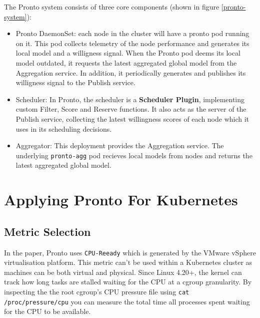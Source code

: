 The Pronto system consists of three core components (shown in figure
\ref{pronto-system}):
\begin{itemize}
    \item Pronto DaemonSet: each node in the cluster will have a pronto pod
        running on it. This pod collects telemetry of the node performance and
        generates its local model and a willigness signal. When the Pronto pod
        deems its local model outdated, it requests the latest aggregated global
        model from the Aggregation service. In addition, it periodically
        generates and publishes its willigness signal to the Publish service.
    \item Scheduler: In Pronto, the scheduler is a \textbf{Scheduler Plugin}, implementing custom
        Filter, Score and Reserve functions. It also acts as the server of the
        Publish service, collecting the latest willingness scores of each node
        which it uses in its scheduling decisions.
    \item Aggregator: This deployment provides the Aggregation service. The
        underlying \verb|pronto-agg| pod recieves local models from nodes and
        returns the latest aggregated global model.
\end{itemize}

\section{Applying Pronto For Kubernetes}

\subsection{Metric Selection}
In the paper, Pronto uses \verb|CPU-Reeady| which is generated by the VMware
vSphere virtualisation platform. This metric can't be used within a
Kubernetes cluster as machines can be both virtual and physical. Since Linux
4.20+, the kernel can track how long tasks are stalled waiting for the CPU
at a cgroup granularity. By inspecting the the root cgroup’s CPU pressure
file using \verb|cat /proc/pressure/cpu| you can measure the total time all
processes spent waiting for the CPU to be available.

